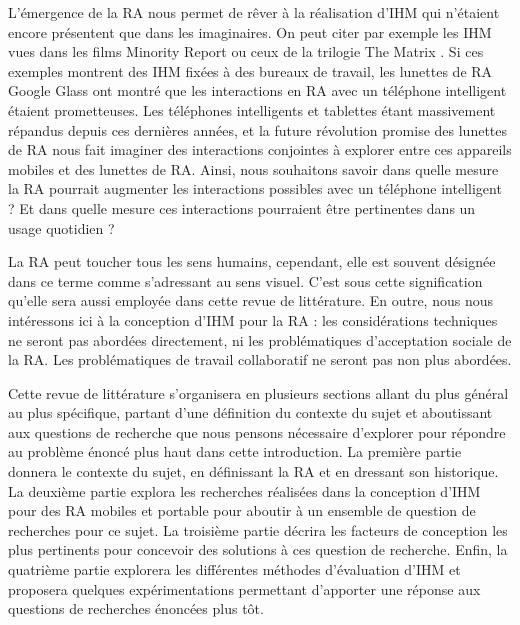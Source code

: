 L'émergence de la RA nous permet de rêver à la réalisation d'IHM qui n'étaient encore présentent que dans les imaginaires. On peut citer par exemple les IHM vues dans les films Minority Report  ou ceux de la trilogie The Matrix . Si ces exemples montrent des IHM fixées à des bureaux de travail, les lunettes de RA Google Glass ont montré que les interactions en RA avec un téléphone intelligent étaient prometteuses. Les téléphones intelligents et tablettes étant massivement répandus depuis ces dernières années, et la future révolution promise des lunettes de RA nous fait imaginer des interactions conjointes à explorer entre ces appareils mobiles et des lunettes de RA. Ainsi, nous souhaitons savoir dans quelle mesure la RA pourrait augmenter les interactions possibles avec un téléphone intelligent ? Et dans quelle mesure ces interactions pourraient être pertinentes dans un usage quotidien ?



La RA peut toucher tous les sens humains, cependant, elle est souvent désignée dans ce terme comme s'adressant au sens visuel. C'est sous cette signification qu'elle sera aussi employée dans cette revue de littérature. En outre, nous nous intéressons ici à la conception d'IHM pour la RA : les considérations techniques ne seront pas abordées directement, ni les problématiques d'acceptation sociale de la RA. Les problématiques de travail collaboratif ne seront pas non plus abordées.

Cette revue de littérature s'organisera en plusieurs sections allant du plus général au plus spécifique, partant d'une définition du contexte du sujet et aboutissant aux questions de recherche que nous pensons nécessaire d'explorer pour répondre au problème énoncé plus haut dans cette introduction. La première partie donnera le contexte du sujet, en définissant la RA et en dressant son historique. La deuxième partie explora les recherches réalisées dans la conception d'IHM pour des RA mobiles et portable pour aboutir à un ensemble de question de recherches pour ce sujet. La troisième partie décrira les facteurs de conception les plus pertinents pour concevoir des solutions à ces question de recherche. Enfin, la quatrième partie explorera les différentes méthodes d'évaluation d'IHM et proposera quelques expérimentations permettant d'apporter une réponse aux questions de recherches énoncées plus tôt.

